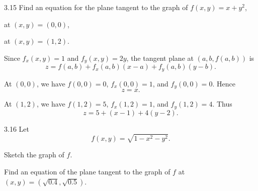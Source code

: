 \documentclass[11pt,oneside]{article}
\begin{document}

\begin{problem}{3.15}
Find an equation for the plane tangent to the graph of $f(x,y)=x+y^2$,
\begin{problemsubparts}
    \item at $(x,y)=(0,0)$,
    \item at $(x,y)=(1,2)$.
\end{problemsubparts}
\end{problem}

\begin{solution}
Since $f_x(x,y)=1$ and $f_y(x,y)=2y$, the tangent plane at $(a,b,f(a,b))$ is
\[
    z=f(a,b)+f_x(a,b)(x-a)+f_y(a,b)(y-b).
\]
\begin{problemsubparts}
    \item At $(0,0)$, we have $f(0,0)=0$, $f_x(0,0)=1$, and $f_y(0,0)=0$. Hence
    \[
        \boxed{z=x}.
    \]

    \item At $(1,2)$, we have $f(1,2)=5$, $f_x(1,2)=1$, and $f_y(1,2)=4$. Thus
    \[
        \boxed{z=5+(x-1)+4(y-2)}.
    \]
\end{problemsubparts}
\end{solution}

\begin{problem}{3.16}
Let
\[
    f(x,y)=\sqrt{1-x^2-y^2}.
\]
\begin{problemsubparts}
    \item Sketch the graph of $f$.
    \item Find an equation of the plane tangent to the graph of $f$ at $(x,y)=(\sqrt{0.4},\sqrt{0.5})$.
\end{problemsubparts}
\end{problem}
\end{document}
